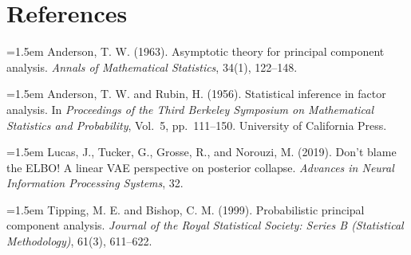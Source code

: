 \documentclass[11pt]{article}
\theoremstyle{remark}
\begin{document}
\section*{References}

\begingroup
\setlength{\parindent}{0pt}
\setlength{\parskip}{0.8em}

\hangindent=1.5em
Anderson, T. W. (1963). Asymptotic theory for principal component analysis.
\emph{Annals of Mathematical Statistics}, 34(1), 122--148.

\hangindent=1.5em
Anderson, T. W. and Rubin, H. (1956). Statistical inference in factor analysis.
In \emph{Proceedings of the Third Berkeley Symposium on Mathematical Statistics and Probability}, Vol.~5, pp.~111--150. University of California Press.

\hangindent=1.5em
Lucas, J., Tucker, G., Grosse, R., and Norouzi, M. (2019). Don't blame the ELBO! A linear VAE perspective on posterior collapse. \emph{Advances in Neural Information Processing Systems}, 32.

\hangindent=1.5em
Tipping, M. E. and Bishop, C. M. (1999). Probabilistic principal component analysis.
\emph{Journal of the Royal Statistical Society: Series B (Statistical Methodology)}, 61(3), 611--622.

\endgroup
\end{document}
